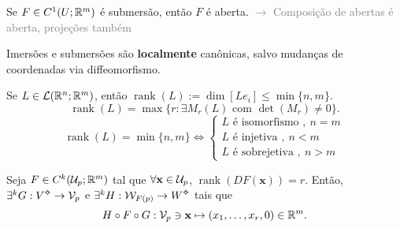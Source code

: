 \begin{tikzpicture}[scale= 1, >=to, shift={(0.65cm,4.85cm)}, baseline={(current bounding box.center)}, remember picture, overlay]
\end{tikzpicture}

\begin{corollary}
    Se \(F\in C^1(U; \R^m)\) é submersão, então \(F\) é aberta. \textcolor{gray}{ \(\rightarrow \) Composição de abertas é aberta, projeções também }
\end{corollary}

\begin{note}
  Imersões e submersões são \textbf{localmente} canônicas, salvo mudanças de coordenadas via diffeomorfismo.
\end{note}

\begin{definition}[Posto]
  Se \(L\in \mathcal{L}(\R^n ;\R^m)\), então \(\operatorname{rank}(L):= \dim [Le_i]\leq \min \{n,m\}\).  
  \[\operatorname{rank}(L) = \max\{ r: \exists M_r(L)\text{ com } \det (M_r)\neq 0\}.\]
  \[\operatorname{rank}(L) = \min\{n, m\} \Leftrightarrow \begin{cases}
      L \text{ é isomorfismo }, \ n=m \\
      L \text{ é injetiva }, \  n< m \\
      L \text{ é sobrejetiva } ,\ n> m 
    \end{cases}\] 
\end{definition}

\begin{theorem}
    Seja \(F \in C^k(\U_p; \R^m)\) tal que \(\forall \x\in \mathcal{U}_p\), \(\operatorname{rank}(DF(\textbf{x})) = r\). Então, \(\exists  ^k G: V\ab \to \mathcal{V}_p\) e \(\exists ^k H : \mathcal{W}_{F(p)} \to W\ab\) tais que 
    \[H\circ F \circ G : \mathcal{V}_p \ni \textbf{x} \mapsto (x_1, \ldots, x_r, 0) \in \R^m. \]   
\end{theorem}

